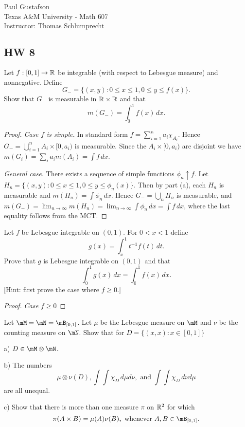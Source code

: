 \documentclass{article}
\begin{document}
\noindent Paul Gustafson\\
\noindent Texas A\&M University - Math 607\\ 
\noindent Instructor: Thomas Schlumprecht

\subsection*{HW 8}
 Let $f:[0,1] \to \mathbb{R}$ be integrable (with respect to Lebesgue measure) and nonnegative. Define 
$$G_{-} =  \{(x,y) : 0 \le x \le 1, 0 \le y \le f(x) \}.$$
Show that $G_-$ is measurable in $\mathbb{R} \times \mathbb{R}$ and that 
$$m(G_-) = \int_0^1 f(x) \, dx.$$
\begin{proof}
\emph{Case $f$ is simple.}  In standard form $f = \sum_{i=1}^n a_i \chi_{A_i}$.  Hence $G_- = \bigcup_{i=1}^n A_i \times [0, a_i)$ is measurable. Since the $A_i \times [0, a_i)$ are disjoint we have $m(G_i) = \sum_i a_i m(A_i) = \int f \, dx$.

\emph{General case.} There exists a sequence of simple functions $\phi_n \uparrow f$.   Let $H_n = \{(x,y) : 0 \le x \le 1, 0 \le y \le \phi_n(x) \}$.  Then by part (a), each $H_n$ is measurable and $m(H_n) = \int \phi_n \, dx$.  Hence $G_- = \bigcup_n H_n$ is measurable, and $m(G_-) = \lim_{n \to \infty} m(H_n) = \lim_{n \to \infty} \int \phi_n \, dx = \int f \, dx$, where the last equality follows from the MCT.
\end{proof}

 Let $f$ be Lebesgue integrable on $(0,1)$. For $0< x < 1$ define
$$g(x) = \int_x^1 t^{-1} f(t) \, dt.$$
Prove that $g$ is Lebesgue integrable on $(0,1)$ and that 
$$\int_0^1 g(x) \, dx = \int_0^1 f(x) \, dx.$$
[Hint: first prove the case where $f \ge 0$.]
\begin{proof}
\emph{Case $f \ge 0$} 

\end{proof}


 Let $\mM = \mN = \mB_{[0,1]}$. Let $\mu$ be the Lebesgue measure on $\mM$ and $\nu$ be the counting measure on $\mN$. Show that for $D = \{(x,x) : x \in [0,1]\}$

a) $D \in \mM \otimes \mN$.

b) The numbers 
$$\mu \otimes \nu (D), \int \int \chi_D \, d\mu d\nu, \text{ and } \int \int \chi_D \, d\nu d\mu$$
are all unequal.

c) Show that there is more than one measure $\pi$ on $\mathbb{R}^2$ for which
$$ \pi(A \times B) = \mu(A) \nu(B), \text{ whenever } A, B \in \mB_{[0,1]}.$$
\end{document}
